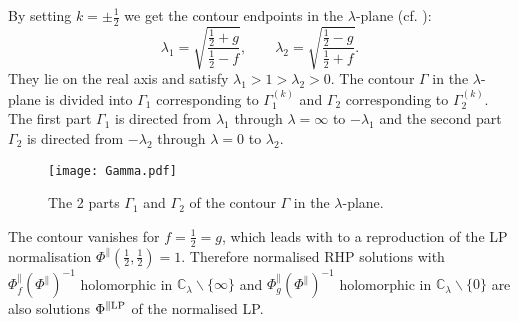 \documentclass[12pt]{iopart}
\begin{document}
By setting $k=\pm \frac12$ we get the contour endpoints in the $\lambda$-plane (cf. ):
\begin{equation}
\lambda_1=\sqrt{\frac{\frac12+g}{\frac12-f}}, \quad\quad 
\lambda_2=\sqrt{\frac{\frac12-g}{\frac12+f}}.
\end{equation}
They lie on the real axis and satisfy $\lambda_1>1>\lambda_2>0$. The contour $\Gamma$ in the $\lambda$-plane is divided into $\Gamma_1$ corresponding to $\Gamma^{(k)}_1$ and $\Gamma_2$ corresponding to $\Gamma^{(k)}_2$. The first part $\Gamma_1$ is directed from $\lambda_1$ through $\lambda=\infty$ to $-\lambda_1$ and the second part $\Gamma_2$ is directed from $-\lambda_2$ through $\lambda=0$ to $\lambda_2$.

\begin{figure}[ht!]
\centering
\texttt{[image: Gamma.pdf]}
\caption{The 2 parts $\Gamma_1$ and $\Gamma_2$ of the contour $\Gamma$ in the $\lambda$-plane.}
\label{Kontur}
\end{figure} 

The contour vanishes for $f=\frac12=g$, which leads with  to a reproduction of the LP normalisation ${\Phi}^\|(\frac12,\frac12)=1$. Therefore normalised RHP solutions with ${\Phi}^\|_f({\Phi}^\|)^{-1}$ holomorphic in $\mathbb{C}_{\lambda}\backslash\{\infty\}$ and ${\Phi}^\|_g({\Phi}^\|)^{-1}$ holomorphic in $\mathbb{C}_{\lambda}\backslash\{0\}$ are also solutions ${\Phi}^{\|\rm LP}$ of the normalised LP. 
\end{document}
